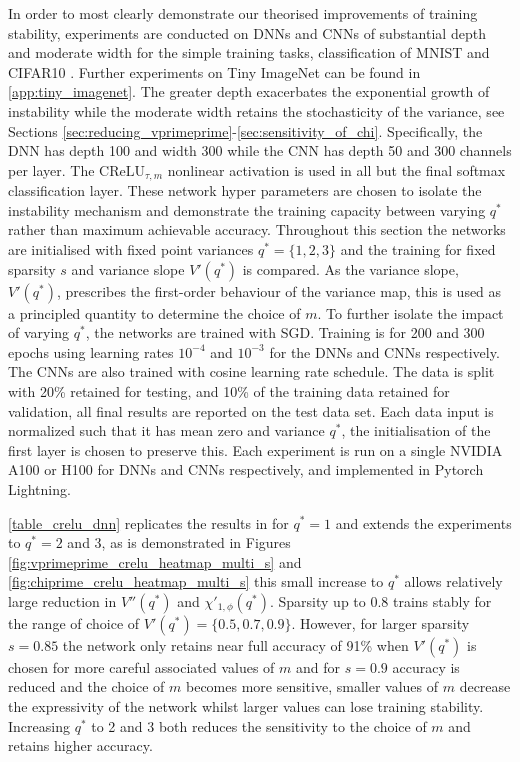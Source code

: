 \documentclass{article}
\theoremstyle{plain}
\theoremstyle{definition}
\theoremstyle{remark}
\begin{document}
In order to most clearly demonstrate our theorised improvements of training stability, experiments are conducted on DNNs and CNNs of substantial depth and moderate width for the simple training tasks, classification of MNIST \cite{lecun_gradient-based_1998} and CIFAR10 \cite{krizhevsky_learning_2009}. Further experiments on Tiny ImageNet \cite{deng_imagenet_2009} can be found in \cref{app:tiny_imagenet}. The greater depth exacerbates the exponential growth of instability while the moderate width retains the stochasticity of the variance, see Sections \ref{sec:reducing_vprimeprime}-\ref{sec:sensitivity_of_chi}.  Specifically, the DNN has depth 100 and width 300 while the CNN has depth 50 and 300 channels per layer. The $\text{CReLU}_{\tau,m}$ nonlinear activation is used in all but the final softmax classification layer.  These network hyper parameters are chosen to isolate the instability mechanism and demonstrate the training capacity between varying $q^{*}$ rather than maximum achievable accuracy. 
  Throughout this section the networks are initialised with fixed point variances $q^*=\{1,2,3\}$ and the training for fixed sparsity $s$ and variance slope $V'(q^*)$ is compared. As the variance slope, $V'(q^*)$, prescribes the first-order behaviour of the variance map, this is used as a principled quantity to determine the choice of $m$.
  To further isolate the impact of varying $q^*$, the networks are trained with SGD. Training is for 200 and 300 epochs using learning rates $10^{-4}$ and $10^{-3}$ for the DNNs and CNNs respectively. The CNNs are also trained with cosine learning rate schedule. The data is split with 20\% retained for testing, and 10\% of the training data retained for validation, all final results are reported on the test data set. Each data input is normalized such that it has mean zero and variance $q^*$, the initialisation of the first layer is chosen to preserve this. 
  Each experiment is run on a single NVIDIA A100 or H100 for DNNs and CNNs respectively, and implemented in Pytorch Lightning.

 \cref{table_crelu_dnn} replicates the results in \cite{price_deep_2023} for $q^{*}=1$ and extends the experiments to $q^*=2$ and $3$, as is demonstrated in Figures \ref{fig:vprimeprime_crelu_heatmap_multi_s} and \ref{fig:chiprime_crelu_heatmap_multi_s} this small increase to $q^*$ allows relatively large reduction in $V''(q^*)$ and $\chi'_{1, \phi}(q^*)$. Sparsity up to 0.8 trains stably for the range of choice of $V'(q^*)=
\{0.5,0.7, 0.9\}$. However, for larger sparsity $s=0.85$ the network only retains near full accuracy of 91\% when $V'(q^*)$ is chosen for more careful associated values of $m$ and for $s=0.9$ accuracy is reduced and the choice of $m$ becomes more sensitive, smaller values of $m$ decrease the expressivity of the network whilst larger values can lose training stability. Increasing $q^*$ to 2 and 3 both reduces the sensitivity to the choice of $m$ and retains higher accuracy.
\end{document}
